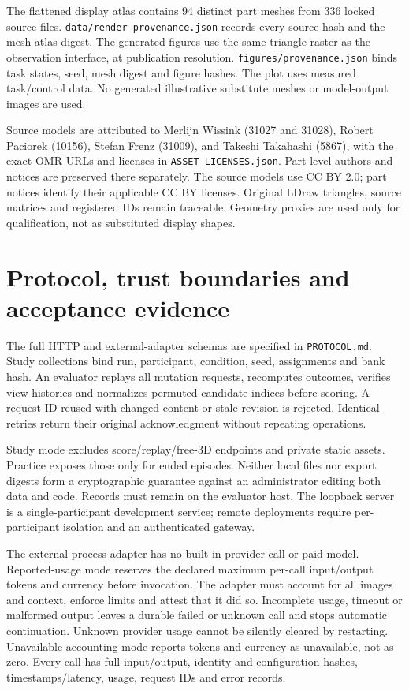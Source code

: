 The flattened display atlas contains 94 distinct part meshes from 336
locked source files. \texttt{data/render-provenance.json} records every
source hash and the mesh-atlas digest. The generated figures use the
same triangle raster as the observation interface, at publication
resolution. \texttt{figures/provenance.json} binds task states, seed,
mesh digest and figure hashes. The plot uses measured task/control data.
No generated illustrative substitute meshes or model-output images are used.

Source models are attributed to Merlijn Wissink (31027 and 31028),
Robert Paciorek (10156), Stefan Frenz (31009), and Takeshi Takahashi (5867),
with the exact OMR URLs and licenses in \texttt{ASSET-LICENSES.json}.
Part-level authors and notices are preserved there separately.
The source models use CC BY 2.0; part notices identify their applicable
CC BY licenses. Original LDraw triangles, source matrices and registered
IDs remain traceable. Geometry proxies are used only for qualification,
not as substituted display shapes.

\section{Protocol, trust boundaries and acceptance evidence}
The full HTTP and external-adapter schemas are specified in
\texttt{PROTOCOL.md}. Study collections bind run, participant, condition,
seed, assignments and bank hash. An evaluator replays all mutation
requests, recomputes outcomes, verifies view histories and normalizes
permuted candidate indices before scoring. A request ID reused with
changed content or stale revision is rejected. Identical retries return
their original acknowledgment without repeating operations.

Study mode excludes score/replay/free-3D endpoints and private static
assets. Practice exposes those only for ended episodes. Neither local
files nor export digests form a cryptographic guarantee against an
administrator editing both data and code. Records must remain on the
evaluator host. The loopback server is a single-participant development
service; remote deployments require per-participant isolation and an
authenticated gateway.

The external process adapter has no built-in provider call or paid model.
Reported-usage mode reserves the declared maximum per-call input/output
tokens and currency before invocation. The adapter must account for all
images and context, enforce limits and attest that it did so.
Incomplete usage, timeout or malformed output leaves a durable failed or
unknown call and stops automatic continuation. Unknown provider usage
cannot be silently cleared by restarting. Unavailable-accounting mode
reports tokens and currency as unavailable, not as zero.
Every call has full input/output, identity and configuration hashes,
timestamps/latency, usage, request IDs and error records.

